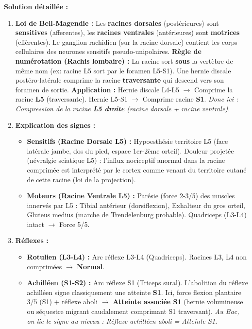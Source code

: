 \documentclass[11pt]{article}
\begin{document}
\begin{exoresolu}
\tcblower
\textbf{Solution détaillée :}
\begin{enumerate}
    \item \textbf{Loi de Bell-Magendie :} Les \textbf{racines dorsales} (postérieures) sont \textbf{sensitives} (afferentes), les \textbf{racines ventrales} (antérieures) sont \textbf{motrices} (efférentes). Le ganglion rachidien (sur la racine dorsale) contient les corps cellulaires des neurones sensitifs pseudo-unipolaires.
    \textbf{Règle de numérotation (Rachis lombaire) :} La racine sort \textbf{sous} la vertèbre de même nom (ex: racine L5 sort par le foramen L5-S1). Une hernie discale postéro-latérale comprime la racine \textbf{traversante} qui descend vers son foramen de sortie.
    \textbf{Application :} Hernie discale L4-L5 $\rightarrow$ Comprime la racine \textbf{L5} (traversante). Hernie L5-S1 $\rightarrow$ Comprime racine \textbf{S1}.
    \textit{Donc ici : Compression de la racine \textbf{L5 droite} (racine dorsale + racine ventrale).}
    \item \textbf{Explication des signes :}
    \begin{itemize}
        \item \textbf{Sensitifs (Racine Dorsale L5) :} Hypoesthésie territoire L5 (face latérale jambe, dos du pied, espace 1er-2ème orteil). Douleur projetée (névralgie sciatique L5) : l'influx nociceptif anormal dans la racine comprimée est interprété par le cortex comme venant du territoire cutané de cette racine (loi de la projection).
        \item \textbf{Moteurs (Racine Ventrale L5) :} Parésie (force 2-3/5) des muscles innervés par L5 : Tibial antérieur (dorsiflexion), Exhalteur du gros orteil, Gluteus medius (marche de Trendelenburg probable). Quadriceps (L3-L4) intact $\rightarrow$ Force 5/5.
    \end{itemize}
    \item \textbf{Réflexes :}
    \begin{itemize}
        \item \textbf{Rotulien (L3-L4) :} Arc réflexe L3-L4 (Quadriceps). Racines L3, L4 non comprimées $\rightarrow$ \textbf{Normal}.
        \item \textbf{Achilléen (S1-S2) :} Arc réflexe S1 (Triceps sural). L'abolition du réflexe achilléen signe classiquement une atteinte \textbf{S1}. Ici, force flexion plantaire 3/5 (S1) + réflexe aboli $\rightarrow$ \textbf{Atteinte associée S1} (hernie volumineuse ou séquestre migrant caudalement comprimant S1 traversant). \textit{Au Bac, on lie le signe au niveau : Réflexe achilléen aboli = Atteinte S1.}

\end{itemize}
\end{enumerate}
\end{exoresolu}
\end{document}
